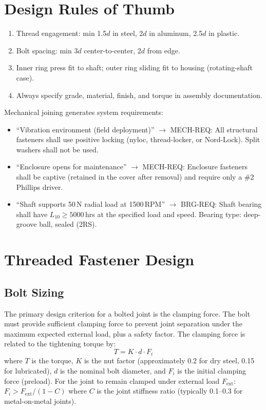 \documentclass[11pt,letterpaper,twoside,openany]{book}
\begin{document}
\section{Design Rules of Thumb}
\begin{enumerate}[leftmargin=1.5em]
\item Thread engagement: min 1.5$d$ in steel, 2$d$ in aluminum, 2.5$d$ in plastic.
\item Bolt spacing: min 3$d$ center-to-center, 2$d$ from edge.
\item Inner ring press fit to shaft; outer ring sliding fit to housing (rotating-shaft case).
\item Always specify grade, material, finish, and torque in assembly documentation.
\end{enumerate}


\begin{keyconceptbox}
Mechanical joining generates system requirements:
\begin{itemize}[nosep,leftmargin=1.5em]
\item ``Vibration environment (field deployment)'' $\to$ MECH-REQ: All structural fasteners shall use positive locking (nyloc, thread-locker, or Nord-Lock). Split washers shall not be used.
\item ``Enclosure opens for maintenance'' $\to$ MECH-REQ: Enclosure fasteners shall be captive (retained in the cover after removal) and require only a \#2 Phillips driver.
\item ``Shaft supports 50\,N radial load at 1500\,RPM'' $\to$ BRG-REQ: Shaft bearing shall have $L_{10} \geq 5000$\,hrs at the specified load and speed. Bearing type: deep-groove ball, sealed (2RS).
\end{itemize}
\end{keyconceptbox}

\section{Threaded Fastener Design}
\subsection{Bolt Sizing}
The primary design criterion for a bolted joint is the clamping force. The bolt must provide sufficient clamping force to prevent joint separation under the maximum expected external load, plus a safety factor. The clamping force is related to the tightening torque by:
\begin{equation}
T = K \cdot d \cdot F_i
\end{equation}
where $T$ is the torque, $K$ is the nut factor (approximately 0.2 for dry steel, 0.15 for lubricated), $d$ is the nominal bolt diameter, and $F_i$ is the initial clamping force (preload). For the joint to remain clamped under external load $F_{\text{ext}}$: $F_i > F_{\text{ext}} / (1 - C)$ where $C$ is the joint stiffness ratio (typically 0.1--0.3 for metal-on-metal joints).
\end{document}

